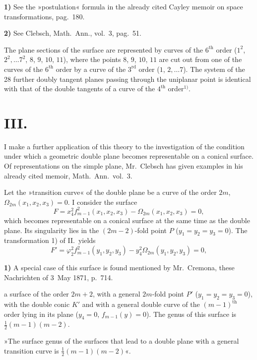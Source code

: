 \documentclass{article}
\begin{document}
\textbf{1)} See the »postulation« formula in the already cited Cayley memoir on space transformations, pag.\ 180.

\textbf{2)} See Clebsch, Math.\ Ann., vol.\ 3, pag.\ 51.

The plane sections of the surface are represented by curves of the $6^{\text{th}}$ order ($1^2$, $2^2, \ldots 7^2$, $8$, $9$, $10$, $11$), where the points $8$, $9$, $10$, $11$ are cut out from one of the curves of the $6^{\text{th}}$ order by a curve of the $3^{\text{rd}}$ order ($1$, $2, \ldots 7$). The system of the 28 further doubly tangent planes passing through the uniplanar point is identical with that of the double tangents of a curve of the $4^{\text{th}}$ order${}^{1)}$.

\section*{III.}

I make a further application of this theory to the investigation of the condition under which a geometric double plane becomes representable on a conical surface. Of representations on the simple plane, Mr.~Clebsch has given examples in his already cited memoir, Math.\ Ann.\ vol.\ 3.

Let the »transition curve« of the double plane be a curve of the order $2m$, $\varOmega_{2m}(x_1, x_2, x_3) = 0$. I consider the surface
\[ F = x_4^2 f_{m-1}^2(x_1, x_2, x_3) - \varOmega_{2m}(x_1, x_2, x_3) = 0, \]
which becomes representable on a conical surface at the same time as the double plane. Its singularity lies in the $(2m-2)$-fold point $P$ ($y_1 = y_2 = y_3 = 0$). The transformation 1) of II.\ yields
\[ F' = \varphi_2^2 f_{m-1}^2(y_1, y_2, y_3) - y_4^2 \varOmega_{2m}(y_1, y_2, y_3) = 0, \]

\textbf{1)} A special case of this surface is found mentioned by Mr.~Cremona, these Nachrichten of 3~May 1871, p.\ 714.

a surface of the order $2m+2$, with a general $2m$-fold point $P'$ ($y_1 = y_2 = y_3 = 0$), with the double conic $K'$ and with a general double curve of the $(m-1)^{\text{th}}$ order lying in its plane ($y_4 = 0$, $f_{m-1}(y) = 0$). The genus of this surface is $\frac{1}{2}(m-1)(m-2)$.

»The surface genus of the surfaces that lead to a double plane with a general transition curve is $\frac{1}{2}(m-1)(m-2)$«.
\end{document}
